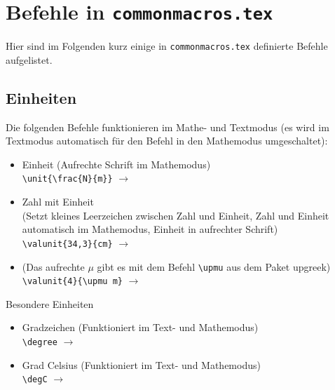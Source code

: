 \chapter{Befehle in \texttt{commonmacros.tex}}
\label{cha:commonmacros}
Hier sind im Folgenden kurz einige in \texttt{commonmacros.tex} definierte Befehle aufgelistet.

%
\section*{Einheiten}
Die folgenden Befehle funktionieren im Mathe- und Textmodus (\dah es wird im Textmodus automatisch für den Befehl in den Mathemodus umgeschaltet):
\begin{itemize}
	\item Einheit (Aufrechte Schrift im Mathemodus)\\ \verb|\unit{}| $\rightarrow$ \unit{\frac{N}{m}}
	\item Zahl mit Einheit\\(Setzt \glqq{}kleines\grqq{} Leerzeichen zwischen Zahl und Einheit, Zahl und Einheit automatisch im Mathemodus, Einheit in aufrechter Schrift)\\ \verb|| $\rightarrow$ \valunit{34,3}{cm}
	\item (Das aufrechte $\mu$ gibt es mit dem Befehl \verb|\upmu| aus dem Paket upgreek)\\ \verb|| $\rightarrow$ \valunit{4}{\upmu m}
\end{itemize}

\noindent Besondere Einheiten
\begin{itemize}
	\item Gradzeichen (Funktioniert im Text- und Mathemodus)\\ \verb|\degree| $\rightarrow$ \degree
	\item Grad Celsius (Funktioniert im Text- und Mathemodus)\\ \verb|\degC| $\rightarrow$ \degC
\end{itemize}



